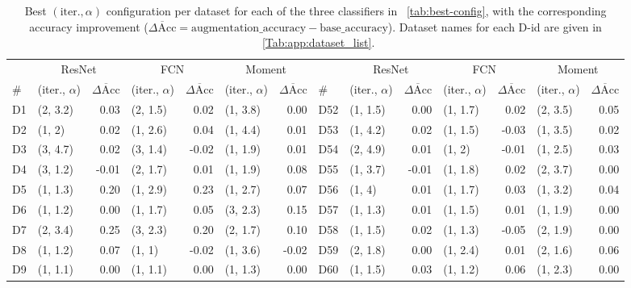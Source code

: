 \begin{table}[p]
\centering
\caption{Best $(\text{iter.}, \alpha)$ configuration per dataset for each of the three classifiers in \tablename~\ref{tab:best-config}, with the corresponding accuracy improvement ($\overline{\Delta\mathrm{Acc}} = \mathrm{augmentation\_accuracy} - \mathrm{base\_accuracy}$). Dataset names for each D-id are given in \tablename~\ref{Tab:app:dataset_list}.}\label{Tab:app:bestconfig}
\footnotesize
\setlength{\tabcolsep}{3pt}
\begin{tabular}{l|lr|lr|lr||l|lr|lr|lr}
\toprule
 & \multicolumn{2}{c|}{ResNet} & \multicolumn{2}{c|}{FCN} & \multicolumn{2}{c||}{Moment} & & \multicolumn{2}{c|}{ResNet} & \multicolumn{2}{c|}{FCN} & \multicolumn{2}{c}{Moment} \\
\# & (iter., $\alpha$) & $\overline{\Delta\mathrm{Acc}}$ & (iter., $\alpha$) & $\overline{\Delta\mathrm{Acc}}$ & (iter., $\alpha$) & $\overline{\Delta\mathrm{Acc}}$ & \# & (iter., $\alpha$) & $\overline{\Delta\mathrm{Acc}}$ & (iter., $\alpha$) & $\overline{\Delta\mathrm{Acc}}$ & (iter., $\alpha$) & $\overline{\Delta\mathrm{Acc}}$ \\
\midrule
D1 & (2, 3.2) & 0.03 & (2, 1.5) & 0.02 & (1, 3.8) & 0.00 & D52 & (1, 1.5) & 0.00 & (1, 1.7) & 0.02 & (2, 3.5) & 0.05 \\
D2 & (1, 2) & 0.02 & (1, 2.6) & 0.04 & (1, 4.4) & 0.01 & D53 & (1, 4.2) & 0.02 & (1, 1.5) & -0.03 & (1, 3.5) & 0.02 \\
D3 & (3, 4.7) & 0.02 & (3, 1.4) & -0.02 & (1, 1.9) & 0.01 & D54 & (2, 4.9) & 0.01 & (1, 2) & -0.01 & (1, 2.5) & 0.03 \\
D4 & (3, 1.2) & -0.01 & (2, 1.7) & 0.01 & (1, 1.9) & 0.08 & D55 & (1, 3.7) & -0.01 & (1, 1.8) & 0.02 & (2, 3.7) & 0.00 \\
D5 & (1, 1.3) & 0.20 & (1, 2.9) & 0.23 & (1, 2.7) & 0.07 & D56 & (1, 4) & 0.01 & (1, 1.7) & 0.03 & (1, 3.2) & 0.04 \\
D6 & (1, 1.2) & 0.00 & (1, 1.7) & 0.05 & (3, 2.3) & 0.15 & D57 & (1, 1.3) & 0.01 & (1, 1.5) & 0.01 & (1, 1.9) & 0.00 \\
D7 & (2, 3.4) & 0.25 & (3, 2.3) & 0.20 & (2, 1.7) & 0.10 & D58 & (1, 1.5) & 0.02 & (1, 1.3) & -0.05 & (2, 1.9) & 0.00 \\
D8 & (1, 1.2) & 0.07 & (1, 1) & -0.02 & (1, 3.6) & -0.02 & D59 & (2, 1.8) & 0.00 & (1, 2.4) & 0.01 & (2, 1.6) & 0.06 \\
D9 & (1, 1.1) & 0.00 & (1, 1.1) & 0.00 & (1, 1.3) & 0.00 & D60 & (1, 1.5) & 0.03 & (1, 1.2) & 0.06 & (1, 2.3) & 0.00 \\

\end{tabular}
\end{table}
